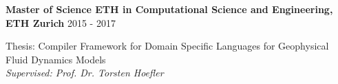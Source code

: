 \textbf{Master of Science ETH in Computational Science and Engineering, ETH Zurich} \hfill 2015 - 2017

Thesis: Compiler Framework for Domain Specific Languages for Geophysical Fluid Dynamics Models \\
\emph{Supervised: Prof. Dr. Torsten Hoefler}

